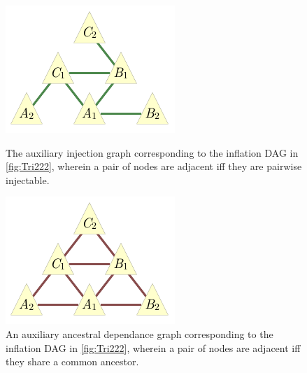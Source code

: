 {\begin{figure}[t]
\centering
\begin{minipage}[b]{0.3\linewidth}
\centering
\includegraphics[scale=1]{injectiongraph222.pdf}
\caption{The auxiliary injection graph corresponding to the inflation DAG in \cref{fig:Tri222}, wherein a pair of nodes are adjacent iff they are pairwise injectable.}\label{fig:injection222}
\end{minipage}
\hfill
\begin{minipage}[b]{0.3\linewidth}
\centering
\includegraphics[scale=1]{ancestraldependancegraph222.pdf}
\caption{An auxiliary ancestral dependance graph corresponding to the inflation DAG in \cref{fig:Tri222}, wherein a pair of nodes are adjacent iff they share a common ancestor.}\label{fig:dependances222}
\end{minipage}
\hfill
\begin{minipage}[b]{0.3\linewidth}
\centering

\end{minipage}
\end{figure}}
